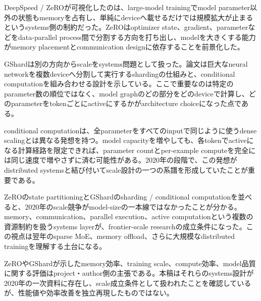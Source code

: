 
DeepSpeed / ZeROが可視化したのは、large-model trainingでmodel parameter以外の状態もmemoryを占有し、単純にdeviceへ載せるだけでは規模拡大が止まるというsystems側の制約だった。ZeROはoptimizer state、gradient、parameterなどをdata-parallel process間で分割する方向を打ち出し、modelを大きくする能力がmemory placementとcommunication designに依存することを前景化した。\autocite{src-f1047e7f654c}


GShardは別の方向からscaleをsystems問題として扱った。論文は巨大なneural networkを複数deviceへ分割して実行するshardingの仕組みと、conditional computationを組み合わせる設計を示している。ここで重要なのは特定のparameter数の順位ではなく、model graphのどの部分をどのdeviceで計算し、どのparameterをtokenごとにactiveにするかがarchitecture choiceになった点である。\autocite{src-56ccf2fa5ce7}


conditional computationは、全parameterをすべてのinputで同じように使うdense scalingとは異なる発想を持つ。model capacityを増やしても、各tokenでactiveになる計算経路を限定できれば、parameter countとper-example computeを完全には同じ速度で増やさずに済む可能性がある。2020年の段階で、この発想がdistributed systemsと結び付いてscale設計の一つの系譜を形成していたことが重要である。\autocite{src-56ccf2fa5ce7}


ZeROのstate partitioningとGShardのsharding / conditional computationを並べると、2020年のscale競争がmodel-sizeの一本線ではなかったことが分かる。memory、communication、parallel execution、active computationという複数の資源制約を扱うsystems layerが、frontier-scale researchの成立条件になった。この視点は翌年のsparse MoE、memory offload、さらに大規模なdistributed trainingを理解する土台になる。\autocite{src-56ccf2fa5ce7,src-f1047e7f654c}


\begin{claimboundary}
ZeROやGShardが示したmemory効率、training scale、compute効率、model品質に関する評価はproject・author側の主張である。本稿はそれらのsystems設計が2020年の一次資料に存在し、scale成立条件として扱われたことを確認しているが、性能値や効率改善を独立再現したものではない。\autocite{src-56ccf2fa5ce7,src-f1047e7f654c}
\end{claimboundary}
